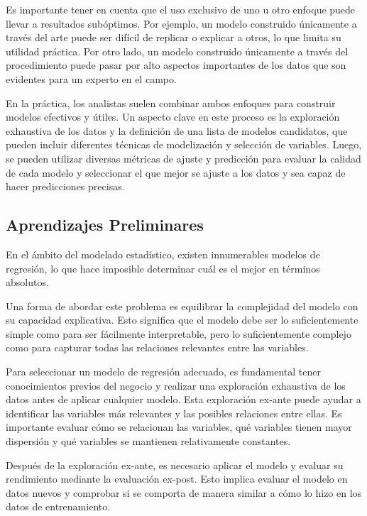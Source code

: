 \documentclass[
]{book}
\begin{document}
Es importante tener en cuenta que el uso exclusivo de uno u otro enfoque
puede llevar a resultados subóptimos. Por ejemplo, un modelo construido
únicamente a través del arte puede ser difícil de replicar o explicar a
otros, lo que limita su utilidad práctica. Por otro lado, un modelo
construido únicamente a través del procedimiento puede pasar por alto
aspectos importantes de los datos que son evidentes para un experto en
el campo.

En la práctica, los analistas suelen combinar ambos enfoques para
construir modelos efectivos y útiles. Un aspecto clave en este proceso
es la exploración exhaustiva de los datos y la definición de una lista
de modelos candidatos, que pueden incluir diferentes técnicas de
modelización y selección de variables. Luego, se pueden utilizar
diversas métricas de ajuste y predicción para evaluar la calidad de cada
modelo y seleccionar el que mejor se ajuste a los datos y sea capaz de
hacer predicciones precisas.

\hypertarget{aprendizajes-preliminares}{%
\subsection{Aprendizajes Preliminares}\label{aprendizajes-preliminares}}

En el ámbito del modelado estadístico, existen innumerables modelos de
regresión, lo que hace imposible determinar cuál es el mejor en términos
absolutos.

Una forma de abordar este problema es equilibrar la complejidad del
modelo con su capacidad explicativa. Esto significa que el modelo debe
ser lo suficientemente simple como para ser fácilmente interpretable,
pero lo suficientemente complejo como para capturar todas las relaciones
relevantes entre las variables.

Para seleccionar un modelo de regresión adecuado, es fundamental tener
conocimientos previos del negocio y realizar una exploración exhaustiva
de los datos antes de aplicar cualquier modelo. Esta exploración ex-ante
puede ayudar a identificar las variables más relevantes y las posibles
relaciones entre ellas. Es importante evaluar cómo se relacionan las
variables, qué variables tienen mayor dispersión y qué variables se
mantienen relativamente constantes.

Después de la exploración ex-ante, es necesario aplicar el modelo y
evaluar su rendimiento mediante la evaluación ex-post. Esto implica
evaluar el modelo en datos nuevos y comprobar si se comporta de manera
similar a cómo lo hizo en los datos de entrenamiento.
\end{document}
